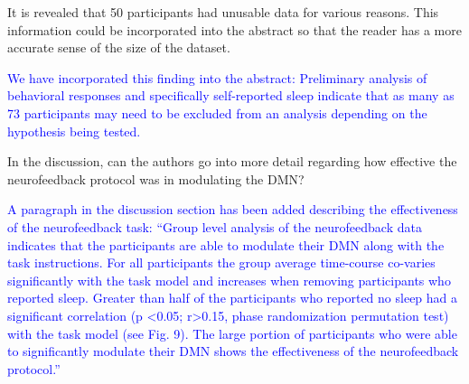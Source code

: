 \documentclass{article}
\newcommand{\RESPONSE}[1]{\textcolor{blue}{#1}}
\begin{document}
It is revealed that 50 participants had unusable data for various reasons. This information could be incorporated into the abstract so that the reader has a more accurate sense of the size of the dataset.

\RESPONSE{We have incorporated this finding into the abstract: Preliminary analysis of behavioral responses and specifically self-reported sleep indicate that as many as 73 participants may need to be excluded from an analysis depending on the hypothesis being tested.}

In the discussion, can the authors go into more detail regarding how effective the neurofeedback protocol was in modulating the DMN?

\RESPONSE{A paragraph in the discussion section has been added describing the effectiveness of the neurofeedback task: ``Group level analysis of the neurofeedback data indicates that the participants are able to modulate their DMN along with the task instructions. For all participants the group average time-course co-varies significantly with the task model and increases when removing participants who reported sleep. Greater than half of the  participants who reported no sleep had a  significant correlation (p \textless 0.05; r\textgreater 0.15, phase randomization permutation test) with the task model (see Fig. 9). The large portion of participants who were able to significantly modulate their DMN shows the effectiveness of the neurofeedback protocol.''}
\end{document}
